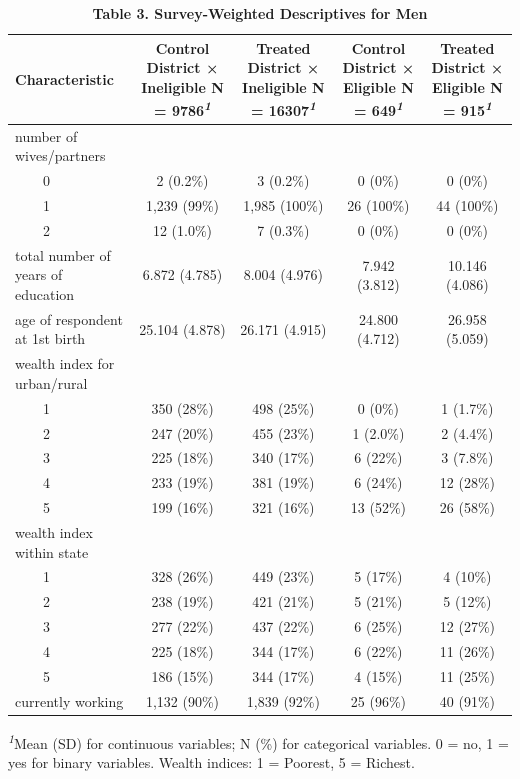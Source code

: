 \documentclass[
]{article}
\begin{document}
\begin{table}[t]
\caption{\label{tab:Second descriptive-table}\textbf{Table 3. Survey-Weighted Descriptives for Men}} 
\fontsize{12.0pt}{14.0pt}\selectfont
\begin{tabular*}{\linewidth}{@{\extracolsep{\fill}}lcccc}
\toprule
\textbf{Characteristic} & \textbf{Control District × Ineligible}  N = 9786\textsuperscript{\textit{1}} & \textbf{Treated District × Ineligible}  N = 16307\textsuperscript{\textit{1}} & \textbf{Control District × Eligible}  N = 649\textsuperscript{\textit{1}} & \textbf{Treated District × Eligible}  N = 915\textsuperscript{\textit{1}} \\ 
\midrule\addlinespace[2.5pt]
number of wives/partners &  &  &  &  \\ 
    0 & 2 (0.2\%) & 3 (0.2\%) & 0 (0\%) & 0 (0\%) \\ 
    1 & 1,239 (99\%) & 1,985 (100\%) & 26 (100\%) & 44 (100\%) \\ 
    2 & 12 (1.0\%) & 7 (0.3\%) & 0 (0\%) & 0 (0\%) \\ 
total number of years of education & 6.872
(4.785) & 8.004
(4.976) & 7.942
(3.812) & 10.146
(4.086) \\ 
age of respondent at 1st birth & 25.104
(4.878) & 26.171
(4.915) & 24.800
(4.712) & 26.958
(5.059) \\ 
wealth index for urban/rural &  &  &  &  \\ 
    1 & 350 (28\%) & 498 (25\%) & 0 (0\%) & 1 (1.7\%) \\ 
    2 & 247 (20\%) & 455 (23\%) & 1 (2.0\%) & 2 (4.4\%) \\ 
    3 & 225 (18\%) & 340 (17\%) & 6 (22\%) & 3 (7.8\%) \\ 
    4 & 233 (19\%) & 381 (19\%) & 6 (24\%) & 12 (28\%) \\ 
    5 & 199 (16\%) & 321 (16\%) & 13 (52\%) & 26 (58\%) \\ 
wealth index within state &  &  &  &  \\ 
    1 & 328 (26\%) & 449 (23\%) & 5 (17\%) & 4 (10\%) \\ 
    2 & 238 (19\%) & 421 (21\%) & 5 (21\%) & 5 (12\%) \\ 
    3 & 277 (22\%) & 437 (22\%) & 6 (25\%) & 12 (27\%) \\ 
    4 & 225 (18\%) & 344 (17\%) & 6 (22\%) & 11 (26\%) \\ 
    5 & 186 (15\%) & 344 (17\%) & 4 (15\%) & 11 (25\%) \\ 
currently working & 1,132 (90\%) & 1,839 (92\%) & 25 (96\%) & 40 (91\%) \\ 
\bottomrule
\end{tabular*}
\begin{minipage}{\linewidth}
\textsuperscript{\textit{1}}Mean (SD) for continuous variables; N (\%) for categorical variables. 0 = no, 1 = yes for binary variables. Wealth indices: 1 = Poorest, 5 = Richest.\\
\end{minipage}
\end{table}
\end{document}
